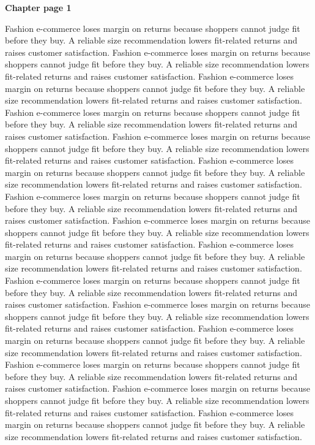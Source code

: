 \documentclass[a4paper,11pt]{article}
\begin{document}
{\headfont\bfseries\Large Chapter page 1}\par\medskip
Fashion e-commerce loses margin on returns because shoppers cannot judge fit before they buy. A reliable size recommendation lowers fit-related returns and raises customer satisfaction. Fashion e-commerce loses margin on returns because shoppers cannot judge fit before they buy. A reliable size recommendation lowers fit-related returns and raises customer satisfaction. Fashion e-commerce loses margin on returns because shoppers cannot judge fit before they buy. A reliable size recommendation lowers fit-related returns and raises customer satisfaction. Fashion e-commerce loses margin on returns because shoppers cannot judge fit before they buy. A reliable size recommendation lowers fit-related returns and raises customer satisfaction. Fashion e-commerce loses margin on returns because shoppers cannot judge fit before they buy. A reliable size recommendation lowers fit-related returns and raises customer satisfaction. 
Fashion e-commerce loses margin on returns because shoppers cannot judge fit before they buy. A reliable size recommendation lowers fit-related returns and raises customer satisfaction. Fashion e-commerce loses margin on returns because shoppers cannot judge fit before they buy. A reliable size recommendation lowers fit-related returns and raises customer satisfaction. Fashion e-commerce loses margin on returns because shoppers cannot judge fit before they buy. A reliable size recommendation lowers fit-related returns and raises customer satisfaction. Fashion e-commerce loses margin on returns because shoppers cannot judge fit before they buy. A reliable size recommendation lowers fit-related returns and raises customer satisfaction. Fashion e-commerce loses margin on returns because shoppers cannot judge fit before they buy. A reliable size recommendation lowers fit-related returns and raises customer satisfaction. 
Fashion e-commerce loses margin on returns because shoppers cannot judge fit before they buy. A reliable size recommendation lowers fit-related returns and raises customer satisfaction. Fashion e-commerce loses margin on returns because shoppers cannot judge fit before they buy. A reliable size recommendation lowers fit-related returns and raises customer satisfaction. Fashion e-commerce loses margin on returns because shoppers cannot judge fit before they buy. A reliable size recommendation lowers fit-related returns and raises customer satisfaction. Fashion e-commerce loses margin on returns because shoppers cannot judge fit before they buy. A reliable size recommendation lowers fit-related returns and raises customer satisfaction. Fashion e-commerce loses margin on returns because shoppers cannot judge fit before they buy. A reliable size recommendation lowers fit-related returns and raises customer satisfaction. \newpage
\end{document}
